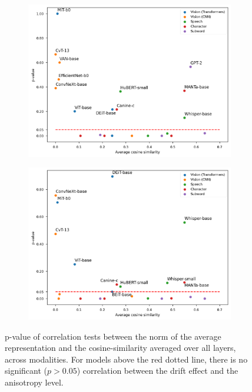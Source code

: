 \begin{figure}[ht]
     \centering
     \begin{subfigure}[b]{0.45\columnwidth}
          \includegraphics[width=\linewidth]{sources/part_1/anisotropy/imgs/pval_vs_cosine_spearman.png}
          \label{fig:pval_vs_cos_spearman}
     \end{subfigure}
     \hfill
     \begin{subfigure}[b]{0.45\columnwidth}
          \includegraphics[width=\linewidth]{sources/part_1/anisotropy/imgs/pval_vs_cosine_pearson.png}
          \label{fig:pval_vs_cos_pearson}
     \end{subfigure}
     \caption{p-value of correlation tests between the norm of the average representation and the cosine-similarity averaged over all layers, across modalities. For models above the red dotted line, there is no significant ($p>0.05$) correlation between the drift effect and the anisotropy level.}
     \label{fig:pval_vs_cos}
 \end{figure}


